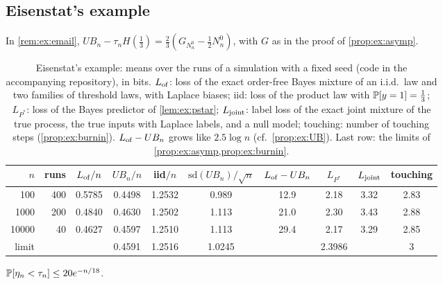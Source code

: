 \subsection{Eisenstat's example}\label{app:ex:eisenstat}

In \cref{rem:ex:email}, $UB_n-\tau_nH(\frac13)=\frac23(G_{N^0_n}-\frac12N^0_n)$, with $G$ as in the proof of \cref{prop:ex:asymp}.

\begin{table}[t]
\centering\small
\setlength{\tabcolsep}{3.5pt}
\begin{tabular}{rrcccccccc}
\toprule
$n$ & runs & $L_{\rm of}/n$ & $UB_n/n$ & iid$/n$ & $\mathrm{sd}(UB_n)/\sqrt n$ & $L_{\rm of}-UB_n$ & $L_{P^*}$ & $L_{\rm joint}$ & touching\\
\midrule
100 & 400 & 0.5785 & 0.4498 & 1.2532 & 0.989 & 12.9 & 2.18 & 3.32 & 2.83\\
1000 & 200 & 0.4840 & 0.4630 & 1.2502 & 1.113 & 21.0 & 2.30 & 3.43 & 2.88\\
10000 & 40 & 0.4627 & 0.4597 & 1.2510 & 1.113 & 29.4 & 2.17 & 3.29 & 2.85\\
limit & & & 0.4591 & 1.2516 & 1.0245 & & 2.3986 & & 3\\
\bottomrule
\end{tabular}

\caption[Eisenstat's example: simulated losses]{Eisenstat's example: means over the runs of a simulation with a fixed seed (code in the accompanying repository), in bits. $L_{\rm of}$: loss of the exact order-free Bayes mixture of an i.i.d.\ law and two families of threshold laws, with Laplace biases; iid: loss of the product law with $\mathbb{P}[y=1]=\frac13$; $L_{P^*}$: loss of the Bayes predictor of \cref{lem:ex:pstar}; $L_{\rm joint}$: label loss of the exact joint mixture of the true process, the true inputs with Laplace labels, and a null model; touching: number of touching steps (\cref{prop:ex:burnin}). $L_{\rm of}-UB_n$ grows like $2.5\log n$ (cf.\ \cref{prop:ex:UB}). Last row: the limits of \cref{prop:ex:asymp,prop:ex:burnin}.}\label{tab:ex:eisenstat}
\end{table}

\begin{lemma}\label{lem:ex:behind}
$\mathbb{P}[\eta_n<\tau_n]\le20e^{-n/18}$.
\end{lemma}

